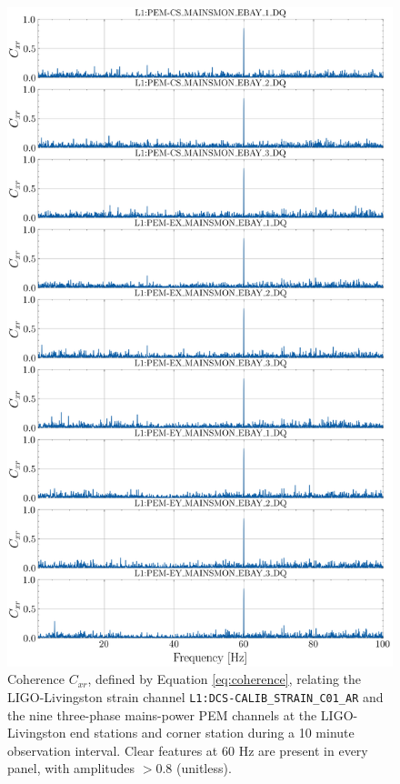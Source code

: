 \documentclass[pra,superscriptaddress,reprint,amsmath,amssymb,nofootinbib]{revtex4-2}
\begin{document}
\begin{figure}
	\begin{center}
		\includegraphics[width=\columnwidth]{images/stacked_coherence_plot_new}
	\end{center}
	\caption{\label{coherenceplot_1} Coherence $C_{xr}$, defined by Equation \eqref{eq:coherence}, relating the LIGO-Livingston strain channel  \texttt{L1:DCS-CALIB\_STRAIN\_C01\_AR} and the nine three-phase mains-power PEM channels at the LIGO-Livingston end stations and corner station during a 10 minute observation interval. Clear features at 60 Hz are present in every panel, with amplitudes $ > 0.8$ (unitless).}
\end{figure}
\end{document}
